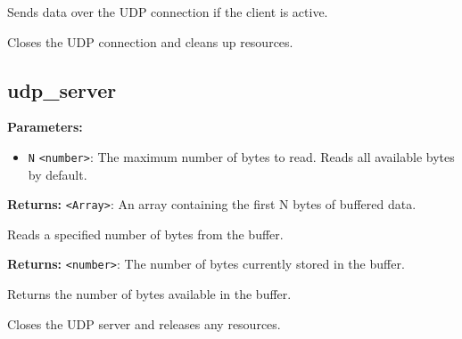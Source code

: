 \documentclass[12pt,a4paper]{article}
\begin{document}
\noindent Sends data over the UDP connection if the client is active.

\vspace{5mm}
\noindent {}


\noindent Closes the UDP connection and cleans up resources.


\subsection{udp\_server}
\vspace{5mm}
\noindent {}


\noindent \textbf{Parameters:}
\begin{itemize}
  \item \texttt{N} \texttt{<number>}: The maximum number of bytes to read. Reads all available bytes by default.
\end{itemize}

\noindent \textbf{Returns:} \texttt{<Array>}: An array containing the first N bytes of buffered data.

\noindent Reads a specified number of bytes from the buffer.

\vspace{5mm}
\noindent {}


\noindent \textbf{Returns:} \texttt{<number>}: The number of bytes currently stored in the buffer.

\noindent Returns the number of bytes available in the buffer.

\vspace{5mm}
\noindent {}


\noindent Closes the UDP server and releases any resources.

\vspace{5mm}
\noindent {}
\end{document}
